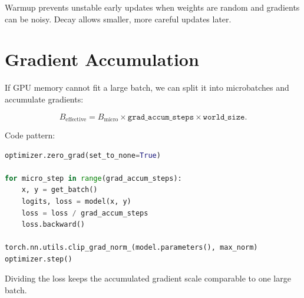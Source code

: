 Warmup prevents unstable early updates when weights are random and gradients can be noisy. Decay allows smaller, more careful updates later.

\section{Gradient Accumulation}

If GPU memory cannot fit a large batch, we can split it into microbatches and accumulate gradients:

\[
B_{\text{effective}}
=B_{\text{micro}}\times \texttt{grad\_accum\_steps}\times \texttt{world\_size}.
\]

\begin{center}
\end{center}

Code pattern:

\begin{lstlisting}[language=Python]
optimizer.zero_grad(set_to_none=True)

for micro_step in range(grad_accum_steps):
    x, y = get_batch()
    logits, loss = model(x, y)
    loss = loss / grad_accum_steps
    loss.backward()

torch.nn.utils.clip_grad_norm_(model.parameters(), max_norm)
optimizer.step()
\end{lstlisting}

Dividing the loss keeps the accumulated gradient scale comparable to one large batch.

